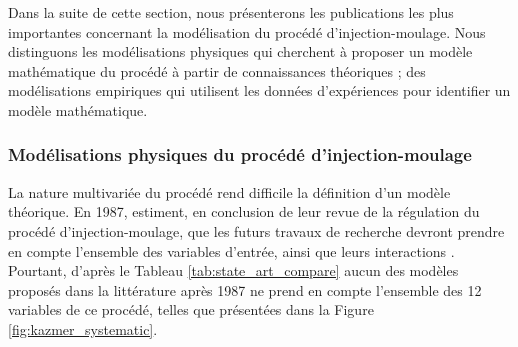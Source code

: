 Dans la suite de cette section, nous présenterons les publications les plus importantes concernant la modélisation du procédé d'injection-moulage.
Nous distinguons les modélisations physiques qui cherchent à proposer un modèle mathématique du procédé à partir de connaissances théoriques ; des modélisations empiriques qui utilisent les données d'expériences pour identifier un modèle mathématique.


\subsubsection{Modélisations physiques du procédé d'injection-moulage} \label{subsubsec:molding_theory}
La nature multivariée du procédé rend difficile la définition d'un modèle théorique.
En 1987, \citeauthor{agrawal_injection-molding_1987} estiment, en conclusion de leur revue de la régulation du procédé d'injection-moulage, que les futurs travaux de recherche devront prendre en compte l’ensemble des variables d'entrée, ainsi que leurs interactions \cite{agrawal_injection-molding_1987}.
Pourtant, d'après le Tableau \ref{tab:state_art_compare} aucun des modèles proposés dans la littérature après 1987 ne prend en compte l'ensemble des 12 variables de ce procédé, telles que présentées dans la Figure \ref{fig:kazmer_systematic}.

